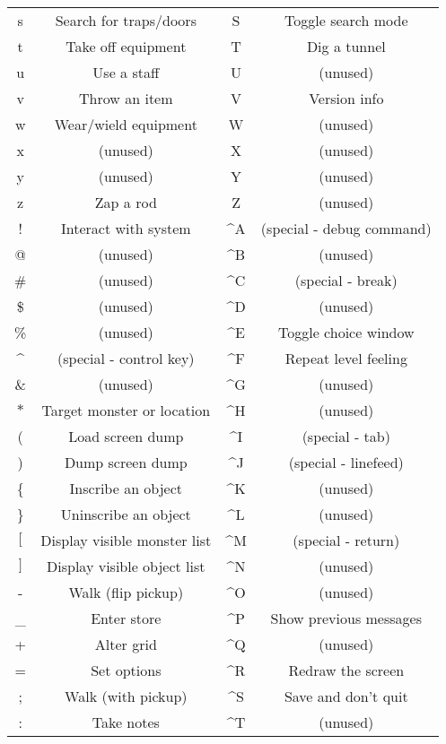 \paragraph{}
\begin{tabular}{cc|cc}
s & Search for traps/doors & S & Toggle search mode\\
t & Take off equipment & T & Dig a tunnel\\
u & Use a staff & U & (unused)\\
v & Throw an item & V & Version info\\
w & Wear/wield equipment & W & (unused)\\
x & (unused) & X & (unused)\\
y & (unused) & Y & (unused)\\
z & Zap a rod & Z & (unused)\\
! & Interact with system & \^{}A & (special - debug command)\\
@ & (unused) & \^{}B & (unused)\\
\# & (unused) & \^{}C & (special - break)\\
\$ & (unused) & \^{}D & (unused)\\
\% & (unused) & \^{}E & Toggle choice window\\
\^{} & (special - control key) & \^{}F & Repeat level feeling\\
\& & (unused) & \^{}G & (unused)\\
$\ast$ & Target monster or location & \^{}H & (unused)\\
( & Load screen dump & \^{}I & (special - tab)\\
) & Dump screen dump & \^{}J & (special - linefeed)\\
\{ & Inscribe an object & \^{}K & (unused)\\
\} & Uninscribe an object & \^{}L & (unused)\\
$[$ & Display visible monster list & \^{}M & (special - return)\\
$]$ & Display visible object list & \^{}N & (unused)\\
- & Walk (flip pickup) & \^{}O & (unused)\\
\_ & Enter store & \^{}P & Show previous messages\\
+ & Alter grid & \^{}Q & (unused)\\
= & Set options & \^{}R & Redraw the screen\\
; & Walk (with pickup) & \^{}S & Save and don't quit\\
: & Take notes & \^{}T & (unused)\\

\end{tabular}

